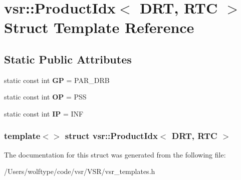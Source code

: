 \hypertarget{structvsr_1_1_product_idx_3_01_d_r_t_00_01_r_t_c_01_4}{\section{vsr\-:\-:Product\-Idx$<$ D\-R\-T, R\-T\-C $>$ Struct Template Reference}
\label{structvsr_1_1_product_idx_3_01_d_r_t_00_01_r_t_c_01_4}
}
\subsection*{Static Public Attributes}
\begin{DoxyCompactItemize}
\item 
\hypertarget{structvsr_1_1_product_idx_3_01_d_r_t_00_01_r_t_c_01_4_a61d1939312dfb2fb1a58d42fa05a8ec6}{static const int {\bfseries G\-P} = P\-A\-R\-\_\-\-D\-R\-B}\label{structvsr_1_1_product_idx_3_01_d_r_t_00_01_r_t_c_01_4_a61d1939312dfb2fb1a58d42fa05a8ec6}

\item 
\hypertarget{structvsr_1_1_product_idx_3_01_d_r_t_00_01_r_t_c_01_4_af7345b9c61a668912934178df37f2af8}{static const int {\bfseries O\-P} = P\-S\-S}\label{structvsr_1_1_product_idx_3_01_d_r_t_00_01_r_t_c_01_4_af7345b9c61a668912934178df37f2af8}

\item 
\hypertarget{structvsr_1_1_product_idx_3_01_d_r_t_00_01_r_t_c_01_4_a3a3258d368719642425b318601637fda}{static const int {\bfseries I\-P} = I\-N\-F}\label{structvsr_1_1_product_idx_3_01_d_r_t_00_01_r_t_c_01_4_a3a3258d368719642425b318601637fda}

\end{DoxyCompactItemize}
\subsubsection*{template$<$$>$ struct vsr\-::\-Product\-Idx$<$ D\-R\-T, R\-T\-C $>$}



The documentation for this struct was generated from the following file\-:\begin{DoxyCompactItemize}
\item 
/\-Users/wolftype/code/vsr/\-V\-S\-R/vsr\-\_\-templates.\-h\end{DoxyCompactItemize}
